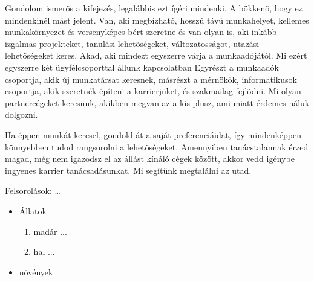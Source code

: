 \documentclass[a4paper]{article}
\begin{document}
Gondolom ismerõs a kifejezés, legalábbis ezt ígéri mindenki. A bökkenõ, hogy ez mindenkinél mást jelent. Van, aki megbízható, hosszú távú munkahelyet, kellemes munkakörnyezet és versenyképes bért szeretne és van olyan is, aki inkább izgalmas projekteket, tanulási lehetõségeket, változatosságot, utazási lehetõségeket keres. Akad, aki mindezt egyszerre várja a munkaadójától. Mi ezért egyszerre két ügyfélcsoporttal állunk kapcsolatban Egyrészt a munkaadók csoportja, akik új munkatársat keresnek, másrészt a mérnökök, informatikusok csoportja, akik szeretnék építeni a karrierjüket, és szakmailag fejlõdni. Mi olyan partnercégeket keresünk, akikben megvan az a kis plusz, ami miatt érdemes náluk dolgozni.

Ha éppen munkát keresel, gondold át a saját preferenciáidat, így mindenképpen könnyebben tudod rangsorolni a lehetõségeket. Amennyiben tanácstalannak érzed magad, még nem igazodsz el az állást kínáló cégek között, akkor vedd igénybe ingyenes karrier tanácsadásunkat. Mi segítünk megtalálni az utad.

Felsorolások: \dots
\begin{itemize}
\item Állatok
\begin{enumerate}
\item madár ...
\item hal ...
\end{enumerate}
\item növények
\end{itemize}
\end{document}
